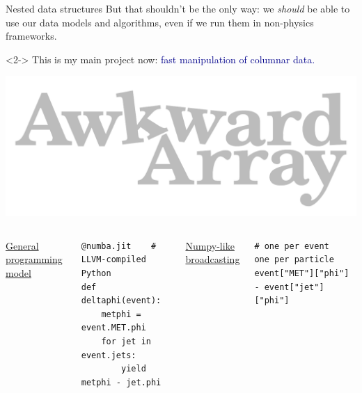 \documentclass[aspectratio=169]{beamer}
\begin{document}
\begin{frame}[fragile]{Nested data structures}
\large
\vspace{0.4 cm}
But that shouldn't be the only way: we {\it should} be able to use our data models and algorithms, even if we run them in non-physics frameworks.

\begin{uncoverenv}<2->
\vspace{0.5 cm}
This is my main project now: \textcolor{darkblue}{fast manipulation of columnar data.}

\vspace{0.25 cm}
\hfill \includegraphics[height=1 cm]{awkward-logo.pdf}

\vspace{0.25 cm}
\vspace{-1 cm}
\scriptsize
\begin{columns}[t]
\underline{\large General programming model}

\begin{verbatim}
@numba.jit    # LLVM-compiled Python
def deltaphi(event):
    metphi = event.MET.phi
    for jet in event.jets:
        yield metphi - jet.phi
\end{verbatim}

\underline{\large Numpy-like broadcasting}

\vspace{\baselineskip}
\begin{verbatim}
# one per event       one per particle
event["MET"]["phi"] - event["jet"]["phi"]
\end{verbatim}
\end{columns}
\end{uncoverenv}

\large
\vspace{0.7 cm}
\end{frame}
\end{document}
